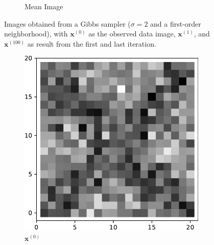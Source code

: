 \begin{figure}[!h]
\begin{subfigure}[b]{0.24\textwidth}
            \caption[]%
            {{\small Mean Image}}    
            \label{fig:2d1mean}
        \end{subfigure}
        \caption[]
        {\small Images obtained from a Gibbs sampler ($\sigma=2$ and a first-order neighborhood), with $\mathbf{x}^{(0)}$ as the observed data image, $\mathbf{x}^{(1)}$, and $\mathbf{x}^{(100)}$ as result from the first and last iteration. }
        \label{fig:2d1}
    \end{figure}
   \begin{figure}[!h]
        \centering
        \begin{subfigure}[b]{0.24\textwidth}
            \centering
            \includegraphics[width=\textwidth]{./img/ximage.pdf}
            \caption[]%
            {{\small $\mathbf{x}^{(0)}$}}    
            \label{fig:ximage3}
        \end{subfigure}
        \begin{subfigure}[b]{0.24\textwidth}  
            \centering 

\end{subfigure}
\end{figure}

